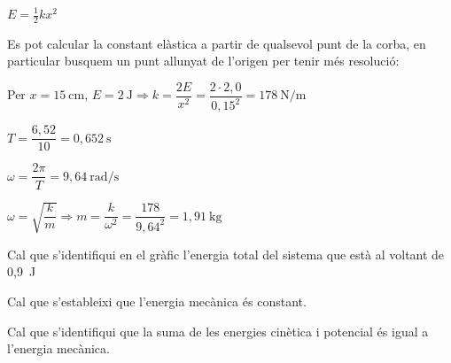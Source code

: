 \begin{solapartat}
 $E = \frac{1}{2}kx^2$

 Es pot calcular la constant elàstica a partir de qualsevol punt de la corba, en particular busquem un punt allunyat de l'origen per tenir més resolució:

Per $x = 15\ \mathrm{cm}$, $E = 2\ \mathrm{J} \Longrightarrow k = \dfrac{2E}{x^2} = \dfrac{2\cdot 2,0}{0,15^2} = 178\ \mathrm{N/m}$

 $T = \dfrac{6,52}{10} = 0,652\ \mathrm{s}$

 $\omega = \dfrac{2\pi}{T} = 9,64\ \mathrm{rad/s}$

 $\omega = \sqrt{\dfrac{k}{m}} \Longrightarrow m = \dfrac{k}{\omega^2} = \dfrac{178}{9,64^2} = 1,91\ \mathrm{kg}$
\end{solapartat}

\begin{solapartat}

 Cal que s'identifiqui en el gràfic l'energia total del sistema que està al voltant de 0,9~J

 Cal que s'estableixi que l'energia mecànica és constant.

 Cal que s'identifiqui que la suma de les energies cinètica i potencial és igual a l'energia mecànica.
\end{solapartat}
